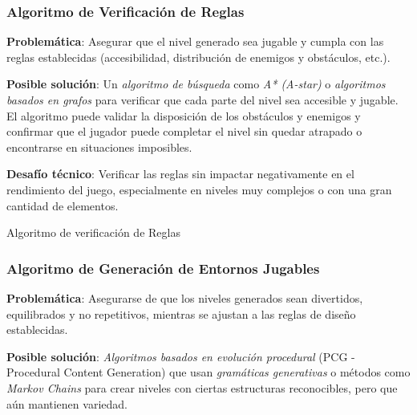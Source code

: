 \subsubsection*{Algoritmo de Verificación de Reglas}

\textbf{Problemática}: Asegurar que el nivel generado sea jugable y cumpla con las reglas establecidas (accesibilidad, distribución de enemigos y obstáculos, etc.).

\textbf{Posible solución}: Un \textit{algoritmo de búsqueda} como \textit{A* (A-star)} o \textit{algoritmos basados en grafos} para verificar que cada parte del nivel sea accesible y jugable. El algoritmo puede validar la disposición de los obstáculos y enemigos y confirmar que el jugador puede completar el nivel sin quedar atrapado o encontrarse en situaciones imposibles.

\textbf{Desafío técnico}: Verificar las reglas sin impactar negativamente en el rendimiento del juego, especialmente en niveles muy complejos o con una gran cantidad de elementos.

\begin{algorithm}
\caption{Algoritmo de verificación de Reglas}
\SetAlgoLined
{}
\end{algorithm}

\subsubsection*{Algoritmo de Generación de Entornos Jugables}

\textbf{Problemática}: Asegurarse de que los niveles generados sean divertidos, equilibrados y no repetitivos, mientras se ajustan a las reglas de diseño establecidas.

\textbf{Posible solución}: \textit{Algoritmos basados en evolución procedural} (PCG - Procedural Content Generation) que usan \textit{gramáticas generativas} o métodos como \textit{Markov Chains} para crear niveles con ciertas estructuras reconocibles, pero que aún mantienen variedad.

